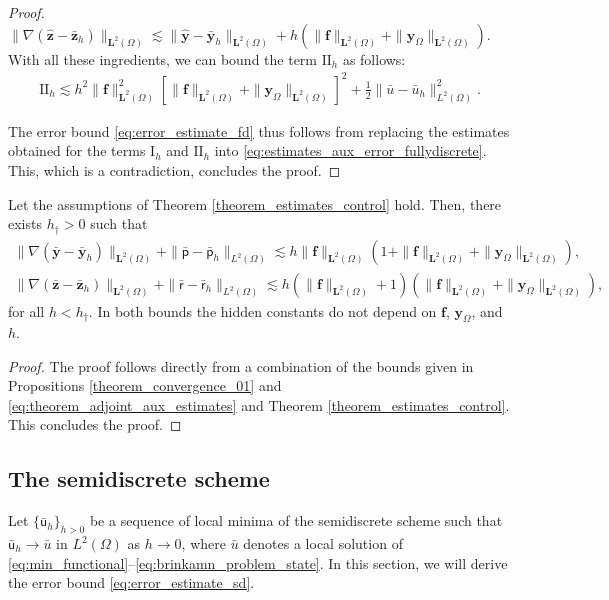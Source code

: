 \documentclass[final]{siamart0216}
\begin{document}
\begin{proof}
$
\|\nabla(\hat{\mathbf{z}}-\bar{\mathbf{z}}_h)\|_{\mathbf{L}^2(\Omega)}
\lesssim \|\hat{\mathbf{y}}-\bar{\mathbf{y}}_h\|_{\mathbf{L}^2(\Omega)}+ h(\|\mathbf{f}\|_{\mathbf{L}^2(\Omega)}+\|\mathbf{y}_{\Omega}\|_{\mathbf{L}^2(\Omega)}).$
With all these ingredients, we can bound the term $\text{II}_h$ as follows:
\begin{align*}
\text{II}_h \lesssim h^2 \|\mathbf{f}\|_{\mathbf{L}^2(\Omega)}^2
\left[\|\mathbf{f}\|_{\mathbf{L}^2(\Omega)}+\|\mathbf{y}_{\Omega}\|_{\mathbf{L}^2(\Omega)}\right]^2
+\tfrac{1}{2}\|\bar{u}-\bar{u}_h\|_{L^2(\Omega)}^2.
\end{align*}

The error bound \eqref{eq:error_estimate_fd} thus follows from replacing the estimates obtained for the terms $\text{I}_h$ and $\text{II}_h$ into \eqref{eq:estimates_aux_error_fullydiscrete}. This, which is a contradiction, concludes the proof.
\end{proof}

\begin{corollary}
Let the assumptions of Theorem \ref{theorem_estimates_control} hold. Then, there exists $h_{\dagger}>0$ such that
\begin{align*}\label{eq:estimates_error_fully_allvariables}
\|\nabla(\bar{\mathbf{y}}-\bar{\mathbf{y}}_{h})\|_{\mathbf{L}^2(\Omega)}+\|\bar{\mathsf{p}}-\bar{\mathsf{p}}_{h}\|_{L^2(\Omega)}
\lesssim h\|\mathbf{f}\|_{\mathbf{L}^2(\Omega)}( 1 + \|\mathbf{f}\|_{\mathbf{L}^2(\Omega)}+\|\mathbf{y}_{\Omega}\|_{\mathbf{L}^2(\Omega)}),
\\
\|\nabla(\bar{\mathbf{z}}-\bar{\mathbf{z}}_{h})\|_{\mathbf{L}^2(\Omega)}+\|\bar{\mathsf{r}}-\bar{\mathsf{r}}_{h}\|_{L^2(\Omega)}
\lesssim 
h ( \|\mathbf{f}\|_{\mathbf{L}^2(\Omega)} + 1 )( \|\mathbf{f}\|_{\mathbf{L}^2(\Omega)}+\|\mathbf{y}_{\Omega}\|_{\mathbf{L}^2(\Omega)}),
\end{align*}
for all $h<h_{\dagger}$. In both bounds the hidden constants do not depend on $\mathbf{f}$, $\mathbf{y}_{\Omega}$, and $h$.
\end{corollary}

\begin{proof}
The proof follows directly from a combination of the bounds given in Propositions \ref{theorem_convergence_01} and \ref{eq:theorem_adjoint_aux_estimates} and Theorem \ref{theorem_estimates_control}. This concludes the proof.
\end{proof}

\subsection{The semidiscrete scheme}
Let $\{\bar{\mathsf{u}}_{h}\}_{h>0}$ be a sequence of local minima of the semidiscrete scheme such that $\bar{\mathsf{u}}_{h}\to\bar{u}$ in $L^2(\Omega)$ as $h \rightarrow 0$, where $\bar{u}$ denotes a local solution of \eqref{eq:min_functional}--\eqref{eq:brinkamn_problem_state}. In this section, we will derive the error bound \eqref{eq:error_estimate_sd}.
\end{document}
